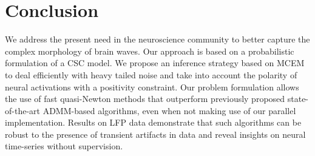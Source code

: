 
\section{Conclusion}

\vspace{-5pt}

We address the present need in the neuroscience community to better capture the complex morphology of brain waves. Our approach is based on a probabilistic formulation of a CSC model. We propose an inference strategy based on MCEM to deal efficiently with heavy tailed noise and take into account the polarity of neural activations with a positivity constraint. Our problem formulation allows the use of fast quasi-Newton methods that outperform previously proposed state-of-the-art ADMM-based algorithms, even when not making use of our parallel implementation. Results on LFP data demonstrate that such algorithms can be robust to the presence of transient artifacts in data and reveal insights on neural time-series without supervision.